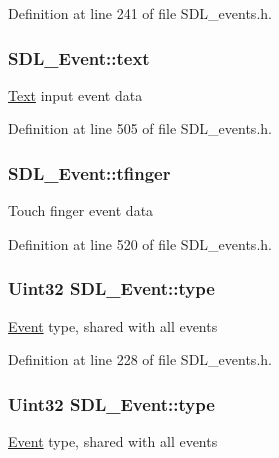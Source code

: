 Definition at line 241 of file S\+D\+L\+\_\+events.\+h.

\hypertarget{unionSDL__Event_aa4fc65c559d69f33c057c0c23d8414b8}{
\subsubsection[{text}]{ S\+D\+L\+\_\+\+Event\+::text}}\label{unionSDL__Event_aa4fc65c559d69f33c057c0c23d8414b8}
\hyperlink{namespaceText}{Text} input event data 

Definition at line 505 of file S\+D\+L\+\_\+events.\+h.

\hypertarget{unionSDL__Event_ab18d7d60794cb056948ffa58541bc3c5}{
\subsubsection[{tfinger}]{ S\+D\+L\+\_\+\+Event\+::tfinger}}\label{unionSDL__Event_ab18d7d60794cb056948ffa58541bc3c5}
Touch finger event data 

Definition at line 520 of file S\+D\+L\+\_\+events.\+h.

\hypertarget{unionSDL__Event_a237648bec242d2d5835f1a4250ddfa46}{
\subsubsection[{type}]{\setlength{\rightskip}{0pt plus 5cm}Uint32 S\+D\+L\+\_\+\+Event\+::type}}\label{unionSDL__Event_a237648bec242d2d5835f1a4250ddfa46}
\hyperlink{classEvent}{Event} type, shared with all events 

Definition at line 228 of file S\+D\+L\+\_\+events.\+h.

\hypertarget{unionSDL__Event_a237648bec242d2d5835f1a4250ddfa46}{
\subsubsection[{type}]{\setlength{\rightskip}{0pt plus 5cm}Uint32 S\+D\+L\+\_\+\+Event\+::type}}\label{unionSDL__Event_a237648bec242d2d5835f1a4250ddfa46}
\hyperlink{classEvent}{Event} type, shared with all events 

